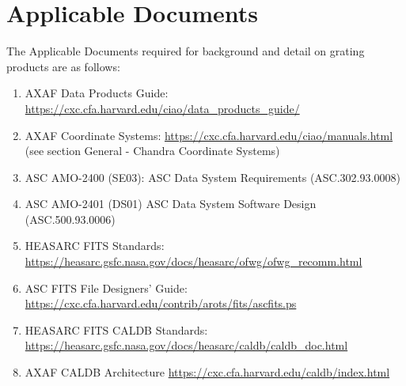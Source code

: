 \documentclass[twoside]{article}
\begin{document}
\section{Applicable Documents}
The Applicable Documents required for background and detail on
grating products are as follows:
\begin{enumerate}

\item\label{appdoc:data-prod} 
  AXAF Data Products Guide:\newline
  \url{https://cxc.cfa.harvard.edu/ciao/data_products_guide/}
\item\label{appdoc:coord}
  AXAF Coordinate Systems:\newline
  \url{https://cxc.cfa.harvard.edu/ciao/manuals.html} (see section General - Chandra Coordinate Systems)
\item\label{appdoc:se03}
 ASC AMO-2400 (SE03):\newline
 ASC Data System Requirements (ASC.302.93.0008)
\item\label{appdoc:ds01}
 ASC AMO-2401 (DS01) \newline
 ASC Data System Software Design (ASC.500.93.0006)
\item\label{appdoc:fitsstd}
  HEASARC FITS Standards:\newline
  \url{https://heasarc.gsfc.nasa.gov/docs/heasarc/ofwg/ofwg_recomm.html}
\item\label{appdoc:ascfits}
  ASC FITS File Designers' Guide:\newline
  \url{https://cxc.cfa.harvard.edu/contrib/arots/fits/ascfits.ps}
\item\label{appdoc:heasarccaldb}
  HEASARC FITS CALDB Standards:\newline
  \url{https://heasarc.gsfc.nasa.gov/docs/heasarc/caldb/caldb_doc.html}
\item\label{appdoc:asccaldb}
  AXAF CALDB Architecture\newline
  \url{https://cxc.cfa.harvard.edu/caldb/index.html}
\end{enumerate}

%
%
\end{document}

